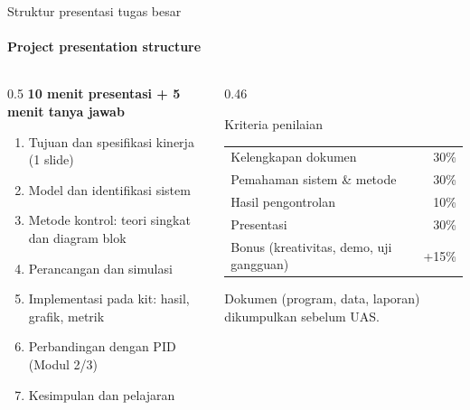 \documentclass[aspectratio=169,10pt]{beamer}
\begin{document}
\begin{frame}{Struktur presentasi tugas besar}
	\framesubtitle{Project presentation structure}
	\begin{columns}[T]
		\begin{column}{0.5\textwidth}
			\small
			\textbf{10 menit presentasi + 5 menit tanya jawab}
			\begin{enumerate}
				\item Tujuan dan spesifikasi kinerja (1 slide)
				\item Model dan identifikasi sistem
				\item Metode kontrol: teori singkat dan diagram blok
				\item Perancangan dan simulasi
				\item Implementasi pada kit: hasil, grafik, metrik
				\item Perbandingan dengan PID (Modul 2/3)
				\item Kesimpulan dan pelajaran
			\end{enumerate}
		\end{column}
		\begin{column}{0.46\textwidth}
			\begin{block}{Kriteria penilaian}
				\small
				\renewcommand{\arraystretch}{1.15}
				\begin{tabular}{@{}l r@{}}
					Kelengkapan dokumen & 30\% \\
					Pemahaman sistem \& metode & 30\% \\
					Hasil pengontrolan & 10\% \\
					Presentasi & 30\% \\
					Bonus (kreativitas, demo, uji gangguan) & +15\% \\
				\end{tabular}
			\end{block}
			{\small Dokumen (program, data, laporan) dikumpulkan sebelum UAS.}
		\end{column}
	\end{columns}
\end{frame}
\end{document}
